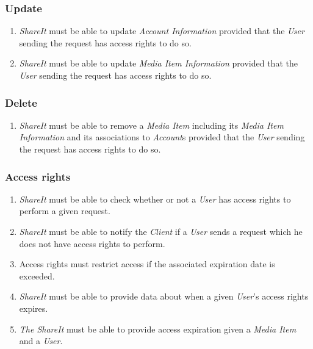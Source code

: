 \documentclass[../report.tex]{subfiles}
\begin{document}
\subsubsection{Update}
\begin{enumerate}[label=\textbf{FR-\twodigits*},resume]

\item \textit{ShareIt} must be able to update \textit{Account Information} provided that the \textit{User} sending the request has access rights to do so.

\item \textit{ShareIt} must be able to update \textit{Media Item Information} provided that the \textit{User} sending the request has access rights to do so.
\end{enumerate}

\subsubsection{Delete}
\begin{enumerate}[label=\textbf{FR-\twodigits*},resume]

\item \textit{ShareIt} must be able to remove a \textit{Media Item} including its \textit{Media Item Information} and its associations to \textit{Account}s provided that the \textit{User} sending the request has access rights to do so.

\end{enumerate}

\subsubsection{Access rights}
\begin{enumerate}[label=\textbf{FR-\twodigits*},resume]

\item \textit{ShareIt} must be able to check whether or not a \textit{User} has access rights to perform a given request.

\item \textit{ShareIt} must be able to notify the \textit{Client} if a \textit{User} sends a request which he does not have access rights to perform.

\item Access rights must restrict access if the associated expiration date is exceeded.

\item \textit{ShareIt} must be able to provide data about when a given \textit{User}'s access rights expires.

\item \textit{The ShareIt} must be able to provide access expiration given a \textit{Media Item} and a \textit{User}.

\end{enumerate}
\end{document}
